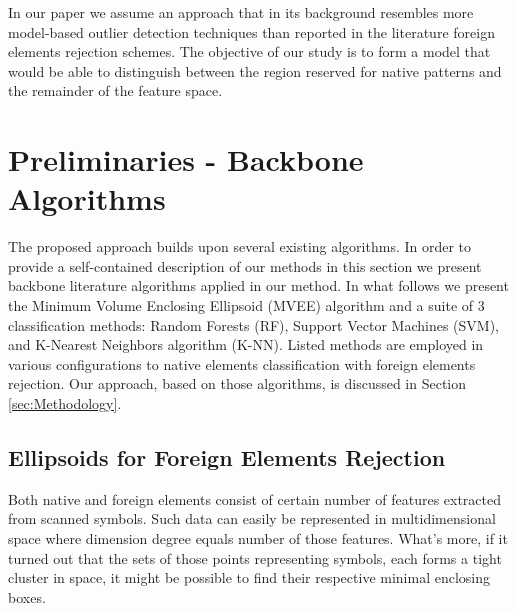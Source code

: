 \documentclass{llncs}
\begin{document}
In our paper we assume an approach that in its background resembles more model-based outlier detection techniques than reported in the literature foreign elements rejection schemes. The objective of our study is to form a model that would be able to distinguish between the region reserved for native patterns and the remainder of the feature space. 

\section{Preliminaries - Backbone Algorithms}
  \label{sec:preliminaries}
  
The proposed approach builds upon several existing algorithms. In order to provide a self-contained description of our methods in this section we present backbone literature algorithms applied in our method. In what follows we present the Minimum Volume Enclosing Ellipsoid (MVEE) algorithm and a suite of 3 classification methods: Random Forests (RF), Support Vector Machines (SVM), and K-Nearest Neighbors algorithm (K-NN). Listed methods are employed in various configurations to native elements classification with foreign elements rejection. Our approach, based on those algorithms, is discussed in Section \ref{sec:Methodology}.

\subsection{Ellipsoids for Foreign Elements Rejection}


Both native and foreign elements consist of certain number of features extracted from scanned symbols. Such data can easily be represented in multidimensional space where dimension degree equals number of those features. What's more, if it turned out that the sets of those points representing symbols, each forms a tight cluster in space, it might be possible to find their respective minimal enclosing boxes.
\end{document}
